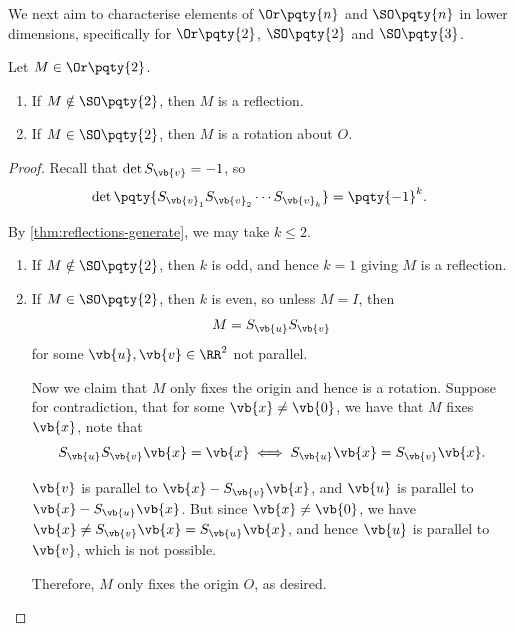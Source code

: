 We next aim to characterise elements of \(\Or\pqty{n}\) and \(\SO\pqty{n}\) in lower dimensions, specifically for \(\Or\pqty{2}\), \(\SO\pqty{2}\) and \(\SO\pqty{3}\).

\begin{lemma}
    \label{lem:elements-in-o2}%
    Let \(M \in \Or\pqty{2}\).
    \begin{enumerate}
        \item If \(M \notin \SO\pqty{2}\), then \(M\) is a reflection.
        \item If \(M \in \SO\pqty{2}\), then \(M\) is a rotation about \(O\).
    \end{enumerate}
\end{lemma}

\begin{proof}
    Recall that \(\det S_{\vb{v}} = -1\), so
    \[
        \det \pqty{S_{\vb{v}_1} S_{\vb{v}_2} \cdots S_{\vb{v}_k}} = \pqty{-1}^k.
    \]

    By \autoref{thm:reflections-generate}, we may take \(k \leq 2\).
    \begin{enumerate}
        \item If \(M \notin \SO\pqty{2}\), then \(k\) is odd, and hence \(k = 1\) giving \(M\) is a reflection.
        \item If \(M \in \SO\pqty{2}\), then \(k\) is even, so unless \(M = I\), then 
        \[
            M = S_{\vb{u}} S_{\vb{v}}
        \]
        for some \(\vb{u}, \vb{v} \in \RR^2\) not parallel.

        Now we claim that \(M\) only fixes the origin and hence is a rotation. Suppose for contradiction, that for some \(\vb{x} \neq \vb{0}\), we have that \(M\) fixes \(\vb{x}\), note that
        \[
            S_{\vb{u}} S_{\vb{v}} \vb{x} = \vb{x} \iff S_{\vb{u}} \vb{x} = S_{\vb{v}} \vb{x}.
        \]

        \(\vb{v}\) is parallel to \(\vb{x} - S_{\vb{v}} \vb{x}\), and \(\vb{u}\) is parallel to \(\vb{x} - S_{\vb{u}} \vb{x}\). But since \(\vb{x} \neq \vb{0}\), we have \(\vb{x} \neq S_{\vb{v}} \vb{x} = S_{\vb{u}} \vb{x}\), and hence \(\vb{u}\) is parallel to \(\vb{v}\), which is not possible.

        Therefore, \(M\) only fixes the origin \(O\), as desired.
    \end{enumerate}
\end{proof}


